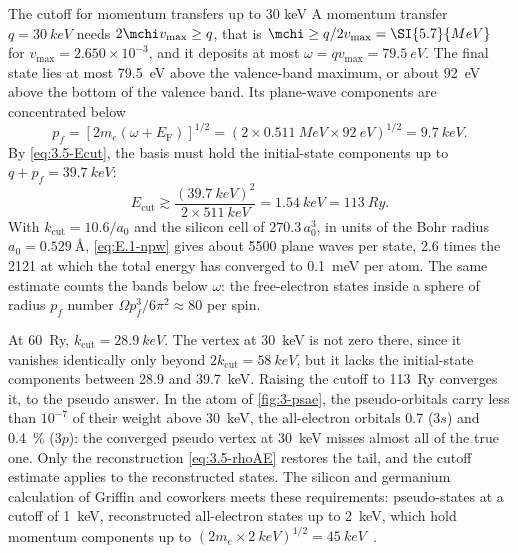 \begin{workedexample}{The cutoff for momentum transfers up to 30 keV}\label{we:3-Ecut}
A momentum transfer $q = \SI{30}{keV}$ needs $2\mchi v_{\mathrm{max}} \ge q$, that is $\mchi \ge q/2v_{\mathrm{max}} = \SI{5.7}{MeV}$ for $v_{\mathrm{max}} = 2.650\times10^{-3}$, and it deposits at most $\omega = qv_{\mathrm{max}} = \SI{79.5}{eV}$. The final state lies at most \SI{79.5}{eV} above the valence-band maximum, or about \SI{92}{eV} above the bottom of the valence band. Its plane-wave components are concentrated below
\begin{equation*}
  p_f = [2m_e(\omega + E_{\mathrm{F}})]^{1/2} = (2\times\SI{0.511}{MeV}\times\SI{92}{eV})^{1/2} = \SI{9.7}{keV} .
\end{equation*}
By \cref{eq:3.5-Ecut}, the basis must hold the initial-state components up to $q + p_f = \SI{39.7}{keV}$:
\begin{equation*}
  E_{\mathrm{cut}} \gtrsim \frac{(\SI{39.7}{keV})^2}{2\times\SI{511}{keV}} = \SI{1.54}{keV} = \SI{113}{Ry} .
\end{equation*}
With $k_{\mathrm{cut}} = 10.6/a_0$ and the silicon cell of $270.3\,a_0^3$, in units of the Bohr radius $a_0 = \SI{0.529}{\angstrom}$, \cref{eq:E.1-npw} gives about 5500 plane waves per state, 2.6 times the 2121 at which the total energy has converged to \SI{0.1}{meV} per atom. The same estimate counts the bands below $\omega$: the free-electron states inside a sphere of radius $p_f$ number $\Omega p_f^3/6\pi^2 \approx 80$ per spin.

At \SI{60}{Ry}, $k_{\mathrm{cut}} = \SI{28.9}{keV}$. The vertex at \SI{30}{keV} is not zero there, since it vanishes identically only beyond $2k_{\mathrm{cut}} = \SI{58}{keV}$, but it lacks the initial-state components between 28.9 and \SI{39.7}{keV}. Raising the cutoff to \SI{113}{Ry} converges it, to the pseudo answer. In the atom of \cref{fig:3-psae}, the pseudo-orbitals carry less than $10^{-7}$ of their weight above \SI{30}{keV}, the all-electron orbitals 0.7 ($3s$) and \SI{0.4}{\percent} ($3p$): the converged pseudo vertex at \SI{30}{keV} misses almost all of the true one. Only the reconstruction \cref{eq:3.5-rhoAE} restores the tail, and the cutoff estimate applies to the reconstructed states. The silicon and germanium calculation of Griffin and coworkers meets these requirements: pseudo-states at a cutoff of \SI{1}{keV}, reconstructed all-electron states up to \SI{2}{keV}, which hold momentum components up to $(2m_e\times\SI{2}{keV})^{1/2} = \SI{45}{keV}$~\cite[Sect.~2.1]{griffin2021extended}.
\end{workedexample}

